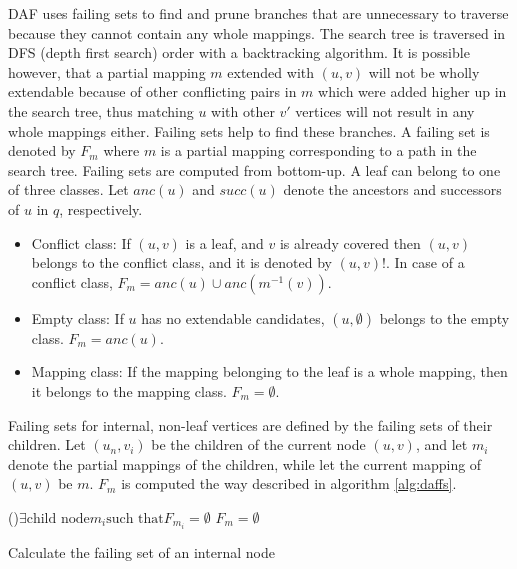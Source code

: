 DAF uses failing sets to find and prune branches that are unnecessary to traverse because they cannot contain any
whole mappings. The search tree is traversed in DFS (depth first search) order with a backtracking algorithm. It
is possible however, that a partial mapping $m$ extended with $(u, v)$ will not be wholly extendable because of
other conflicting pairs in $m$ which were added higher up in the search tree, thus matching $u$ with other $v'$
vertices will not result in any whole mappings either. Failing sets help to find these branches. A failing set is
denoted by $F_m$ where $m$ is a partial mapping corresponding to a path in the search tree. Failing sets are computed
from bottom-up. A leaf can belong to one of three classes. Let $anc(u)$ and $succ(u)$ denote the ancestors and 
successors of $u$ in $q$, respectively.

\begin{itemize}
    \item Conflict class: If $(u, v)$ is a leaf, and $v$ is already covered then $(u, v)$ belongs to the conflict class, and it is denoted by $(u, v)!$. In case of a conflict class, $F_m = anc(u) \cup anc(m^{-1}(v))$.
    \item Empty class: If $u$ has no extendable candidates, $(u, \emptyset)$ belongs to the empty class. $F_m = anc(u)$.
    \item Mapping class: If the mapping belonging to the leaf is a whole mapping, then it belongs to the mapping class. $F_m = \emptyset$.
\end{itemize}

Failing sets for internal, non-leaf vertices are defined by the failing sets of their children. Let $(u_n, v_i)$ be the 
children of the current node $(u, v)$, and let $m_i$ denote the partial mappings of the children, while let the current 
mapping of $(u, v)$ be $m$. $F_m$ is computed the way described in algorithm \ref{alg:daffs}.

\begin{algorithm}[h]
    \SetAlgoLined\DontPrintSemicolon    
    \uIf(){$\exists \text{child node} m_i \text{such that} F_{m_i} = \emptyset$}{
        \nl $F_m = \emptyset$\;
    }
    \label{alg:daffs}
    \caption{Calculate the failing set of an internal node}
\end{algorithm}

